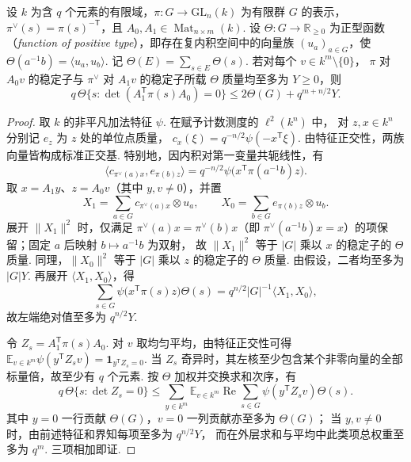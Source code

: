 \begin{lemma}[正型权重下的奇异矩阵估计]
\label{lem:b-positive-type-determinant}
\emitthmsource
设 $k$ 为含 $q$ 个元素的有限域，$\pi:G\to\mathrm{GL}_n(k)$ 为有限群 $G$ 的表示，
$\pi^\vee(s)=\pi(s)^{-{\mathsf T}}$，且 $A_0,A_1\in\operatorname{Mat}_{n\times m}(k)$.
设 $\Theta:G\to\mathbb R_{\ge0}$ 为正型函数（\emph{function of positive type}），即存在复内积空间中的向量族 $(u_a)_{a\in G}$，使
$\Theta(a^{-1}b)=\langle u_a,u_b\rangle$.
记 $\Theta(E)=\sum_{s\in E}\Theta(s)$. 若对每个 $v\in k^m\setminus\{0\}$，
$\pi$ 对 $A_0v$ 的稳定子与 $\pi^\vee$ 对 $A_1v$ 的稳定子所载 $\Theta$ 质量均至多为 $Y\ge0$，则
\[
 q\,\Theta\{s:\det(A_1^{\mathsf T}\pi(s)A_0)=0\}
 \le 2\Theta(G)+q^{m+n/2}Y.
\]
\end{lemma}
\begin{proof}
取 $k$ 的非平凡加法特征 $\psi$. 在赋予计数测度的 $\ell^2(k^n)$ 中，
对 $z,x\in k^n$ 分别记 $e_z$ 为 $z$ 处的单位点质量，
$c_x(\xi)=q^{-n/2}\psi(-x^{\mathsf T}\xi)$.
由特征正交性，两族向量皆构成标准正交基. 特别地，因内积对第一变量共轭线性，有
\[
 \langle c_{\pi^\vee(a)x},e_{\pi(b)z}\rangle
 =q^{-n/2}\psi\bigl(x^{\mathsf T}\pi(a^{-1}b)z\bigr).
\]
取 $x=A_1y$、$z=A_0v$（其中 $y,v\ne0$），并置
\[
 X_1=\sum_{a\in G}c_{\pi^\vee(a)x}\otimes u_a,\qquad
 X_0=\sum_{b\in G}e_{\pi(b)z}\otimes u_b .
\]
展开 $\|X_1\|^2$ 时，仅满足 $\pi^\vee(a)x=\pi^\vee(b)x$（即
$\pi^\vee(a^{-1}b)x=x$）的项保留；固定 $a$ 后映射 $b\mapsto a^{-1}b$ 为双射，
故 $\|X_1\|^2$ 等于 $|G|$ 乘以 $x$ 的稳定子的 $\Theta$ 质量.
同理，$\|X_0\|^2$ 等于 $|G|$ 乘以 $z$ 的稳定子的 $\Theta$ 质量.
由假设，二者均至多为 $|G|Y$. 再展开 $\langle X_1,X_0\rangle$，得
\[
 \sum_{s\in G}\psi\bigl(x^{\mathsf T}\pi(s)z\bigr)\Theta(s)
    =q^{n/2}|G|^{-1}\langle X_1,X_0\rangle ,
\]
故左端绝对值至多为 $q^{n/2}Y$.

令 $Z_s=A_1^{\mathsf T}\pi(s)A_0$. 对 $v$ 取均匀平均，由特征正交性可得
$\mathbb E_{v\in k^m}\psi(y^{\mathsf T}Z_s v)=\mathbf 1_{y^{\mathsf T}Z_s=0}$.
当 $Z_s$ 奇异时，其左核至少包含某个非零向量的全部标量倍，故至少有 $q$ 个元素.
按 $\Theta$ 加权并交换求和次序，有
\[
 q\,\Theta\{s:\det Z_s=0\}
 \le \sum_{y\in k^m}\mathbb E_{v\in k^m}
              \operatorname{Re}\sum_{s\in G}\psi(y^{\mathsf T}Z_s v)\Theta(s).
\]
其中 $y=0$ 一行贡献 $\Theta(G)$，$v=0$ 一列贡献亦至多为 $\Theta(G)$；
当 $y,v\ne0$ 时，由前述特征和界知每项至多为 $q^{n/2}Y$，
而在外层求和与平均中此类项总权重至多为 $q^m$.
三项相加即证.
\end{proof}

